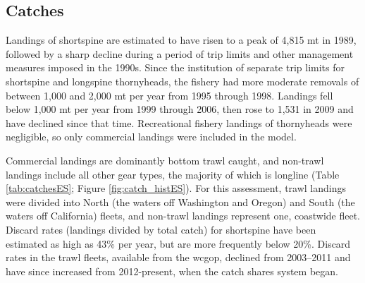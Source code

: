 \documentclass[11pt,
  english,
  letterpaper,
]{article}
\begin{document}
\hypertarget{catches}{%
\subsection*{Catches}\label{catches}}

Landings of shortspine are estimated to have risen to a peak of 4,815 mt in 1989, followed by a sharp decline during a period of trip limits and other management measures imposed in the 1990s. Since the institution of separate trip limits for shortspine and longspine thornyheads, the fishery had more moderate removals of between 1,000 and 2,000 mt per year from 1995 through 1998. Landings fell below 1,000 mt per year from 1999 through 2006, then rose to 1,531 in 2009 and have declined since that time. Recreational fishery landings of thornyheads were negligible, so only commercial landings were included in the model.

Commercial landings are dominantly bottom trawl caught, and non-trawl landings include all other gear types, the majority of which is longline (Table \ref{tab:catchesES}; Figure \ref{fig:catch_histES}). For this assessment, trawl landings were divided into North (the waters off Washington and Oregon) and South (the waters off California) fleets, and non-trawl landings represent one, coastwide fleet. Discard rates (landings divided by total catch) for shortspine have been estimated as high as 43\% per year, but are more frequently below 20\%. Discard rates in the trawl fleets, available from the \gls{wcgop}, declined from 2003--2011 and have since increased from 2012-present, when the catch shares system began.

\begingroup\fontsize{10}{12}\selectfont
\begingroup\fontsize{10}{12}\selectfont
\end{document}
